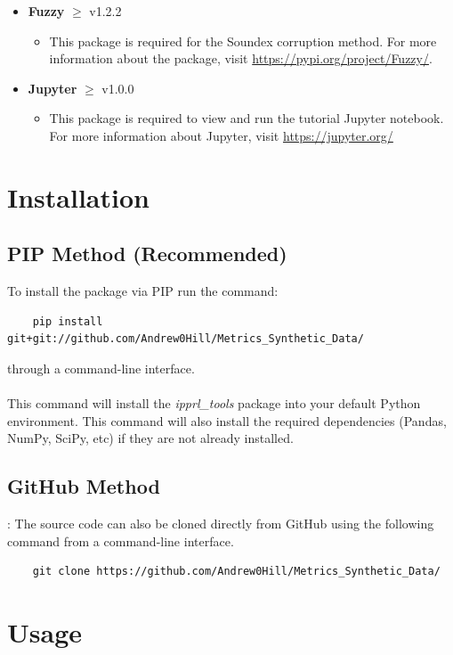 \documentclass[titlepage, 11pt]{article}
\newcommand{\pkgname}{\textit{ipprl\_tools}}
\begin{document}
\begin{itemize}
    \item \textbf{Fuzzy} $\geq$ v1.2.2
    \begin{itemize}
        \item This package is required for the Soundex corruption method. For more information about the package, visit \url{https://pypi.org/project/Fuzzy/}.
    \end{itemize}
    \item \textbf{Jupyter} $\geq$ v1.0.0
    \begin{itemize}
        \item This package is required to view and run the tutorial Jupyter notebook. For more information about Jupyter, visit \url{https://jupyter.org/}
    \end{itemize}
\end{itemize}

\section{Installation}

\subsection{PIP Method (Recommended)}
To install the package via PIP run the command:
\begin{verbatim}
    pip install git+git://github.com/Andrew0Hill/Metrics_Synthetic_Data/
\end{verbatim}
through a command-line interface.
\\
\\
\noindent This command will install the \pkgname{} package into your default Python environment. This command will also install the required dependencies (Pandas, NumPy, SciPy, etc) if they are not already installed. 

\subsection{GitHub Method}: 
The source code can also be cloned directly from GitHub using the following command from a command-line interface.

\begin{verbatim}
    git clone https://github.com/Andrew0Hill/Metrics_Synthetic_Data/
\end{verbatim}

\section{Usage}
\end{document}
